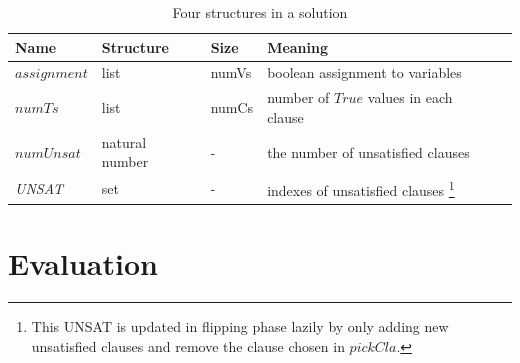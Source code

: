 \documentclass[12pt,a4paper,twoside]{scrartcl}
\numberwithin{equation}{section}
\begin{document}
\begin{table}[h!]
\begin{center}
    \begin{tabular}{|l|l|l|l|p{1cm}|}
\hline 
 	Name &Structure & Size & Meaning\\ \hline
    $assignment$&list & numVs & boolean assignment to variables\\ \hline
	$numTs$&list & numCs& number of $True$ values in each clause \\ \hline
	$numUnsat$& natural number & -&the number of unsatisfied clauses  \\ \hline
	\emph{UNSAT}& set & - & indexes of unsatisfied clauses \footnote{This UNSAT is updated in flipping phase lazily by only adding new unsatisfied clauses and remove the clause chosen in $pickCla$.}\\ \hline

	
\end{tabular}
\caption[probSAT]{Four structures in a solution}
\end{center}
\end{table} 
\clearpage
\section{Evaluation} 
\label{sec:eva}
\end{document}

